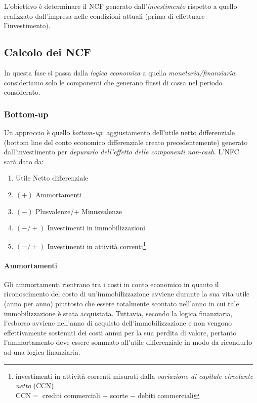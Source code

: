 L’obiettivo è determinare il NCF generato dall’\emph{investimento} rispetto a quello
realizzato dall’impresa nelle condizioni attuali (prima di effettuare l’investimento).

\subsection{Calcolo dei NCF}
In questa fase si passa dalla \emph{logica economica} a quella \emph{monetaria/finanziaria}:
consideriamo solo le componenti che generano flussi di cassa nel periodo considerato.

\subsubsection{Bottom-up}
Un approccio è quello \emph{bottom-up}: aggiustamento dell’utile netto differenziale (bottom line del conto economico differenziale
creato precedentemente) generato dall’investimento per \emph{depurarlo dell’effetto delle componenti non-cash}.
L'NFC sarà dato da:
\begin{enumerate}
    \item Utile Netto differenziale
    \item $(+)$ Ammortamenti
    \item $(-)$ Plusvalenze/$+$ Minusvalenze
    \item $(-/+)$ Investimenti in immobilizzazioni
    \item $(-/+)$ Investimenti in attività correnti\footnote{investimenti in attività correnti misurati dalla \emph{variazione di capitale circolante netto} (CCN)
    \\CCN$=$ crediti commerciali $+$ scorte $-$ debiti commerciali}
\end{enumerate}

\paragraph{Ammortamenti} Gli ammortamenti rientrano tra i costi in conto economico in quanto il riconoscimento del costo di
un’immobilizzazione avviene durante la sua vita utile (anno per anno) piuttosto che essere totalmente
scontato nell’anno in cui tale immobilizzazione è stata acquistata. Tuttavia, secondo la logica finanziaria,
l’esborso avviene nell’anno di acquisto dell’immobilizzazione e
non vengono effettivamente sostenuti dei costi annui per la sua perdita di valore, pertanto l’ammortamento deve essere
sommato all’utile differenziale in modo da ricondurlo ad una logica finanziaria.

